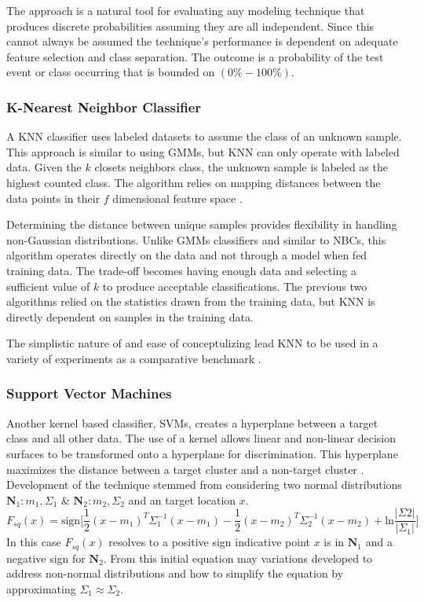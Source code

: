 The approach is a natural tool for evaluating any modeling technique that produces discrete probabilities assuming they are all independent. Since this cannot always be assumed the technique's performance is dependent on adequate feature selection and class separation. The outcome is a probability of the test event or class occurring that is bounded on $(0\%-100\%)$.

\subsubsection{K-Nearest Neighbor Classifier}

A \ac{KNN} classifier uses labeled datasets to assume the class of an unknown sample. This approach is similar to using \acp{GMM}, but \ac{KNN} can only operate with labeled data. Given the $k$ closets neighbors class, the unknown sample is labeled as the highest counted class. The algorithm relies on mapping distances between the data points in their $f$ dimensional feature space \cite{Cover1967}.

Determining the distance between unique samples provides flexibility in handling non-Gaussian distributions. Unlike \acp{GMM} classifiers and similar to \acp{NBC}, this algorithm operates directly on the data and not through a model when fed training data. The trade-off becomes having enough data and selecting a sufficient value of $k$ to produce acceptable classifications. The previous two algorithms relied on the statistics drawn from the training data, but \ac{KNN} is directly dependent on samples in the training data.

The simplistic nature of and ease of conceptulizing lead \ac{KNN} to be used in a variety of experiments as a comparative benchmark \cite{Wulsin2011,Acharya2012}.

\subsubsection{Support Vector Machines}

Another kernel based classifier, \acp{SVM}, creates a hyperplane between a target class and all other data. The use of a kernel allows linear and non-linear decision surfaces to be transformed onto a hyperplane for discrimination. This hyperplane maximizes the distance between a target cluster and a non-target cluster \cite{Cortes1995}. Development of the technique stemmed from considering two normal distributions $\bm{N}_{1}:m_{1}, \Sigma_{1}$ \&  $\bm{N}_{2}:m_{2}, \Sigma_{2}$ and an target location $x$.
\begin{equation}
F_{sq}(x)=\text{sign}\Big[ \frac{1}{2}(x-m_{1})^{T}\Sigma_{1}^{-1}(x-m_{1})-\frac{1}{2}(x-m_{2})^{T}\Sigma_{2}^{-1}(x-m_{2})+\text{ln}\frac{\lvert\Sigma{2}\rvert}{\lvert\Sigma_{1}\rvert}\Big]
\end{equation}
In this case $F_{sq}(x)$ resolves to a positive sign indicative point $x$ is in $\bm{N}_{1}$ and a negative sign for $\bm{N}_{2}$. From this initial equation may variations developed to address non-normal distributions and how to simplify the equation by approximating $\Sigma_{1}\approx\Sigma_{2}$.

